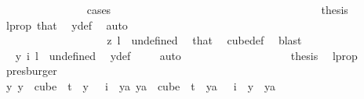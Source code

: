 \begin{isabellebody}
\ \ \ \ \ \ \ \ \ \ \ \ \ \ \isamarkupfalse%
\ cases\isanewline
\ \ \ \ \ \ \ \ \ \ \ \ \ \ \ \ \isamarkupfalse%
\ {}\isanewline
\ \ \ \ \ \ \ \ \ \ \ \ \ \ \ \ \isamarkupfalse%
\ \isamarkupfalse%
\ {\isacharquery}{\kern0pt}thesis\ \isamarkupfalse%
\ l{\isacharunderscore}{\kern0pt}prop\ that{\isacharparenleft}{\kern0pt}{}{\isacharparenright}{\kern0pt}\ \isamarkupfalse%
\ y{\isacharunderscore}{\kern0pt}def\ \isamarkupfalse%
\ auto\isanewline
\ \ \ \ \ \ \ \ \ \ \ \ \ \ \isamarkupfalse%
\isanewline
\ \ \ \ \ \ \ \ \ \ \ \ \ \ \ \ \isamarkupfalse%
\ {}\isanewline
\ \ \ \ \ \ \ \ \ \ \ \ \ \ \ \ \isamarkupfalse%
\ \isamarkupfalse%
\ {\isachardoublequoteopen}z\ l\ {\isacharequal}{\kern0pt}\ undefined{\isachardoublequoteclose}\ \isamarkupfalse%
\ that\ \isamarkupfalse%
\ cube{\isacharunderscore}{\kern0pt}def\ \isamarkupfalse%
\ blast\isanewline
\ \ \ \ \ \ \ \ \ \ \ \ \ \ \ \ \isamarkupfalse%
\ \isamarkupfalse%
\ {\isachardoublequoteopen}y\ i\ l\ {\isacharequal}{\kern0pt}\ undefined{\isachardoublequoteclose}\ \isamarkupfalse%
\ y{\isacharunderscore}{\kern0pt}def\ \isamarkupfalse%
\ {}\ \isamarkupfalse%
\ auto\isanewline
\ \ \ \ \ \ \ \ \ \ \ \ \ \ \ \ \isamarkupfalse%
\ \isamarkupfalse%
\ {\isacharquery}{\kern0pt}thesis\ \isamarkupfalse%
\ l{\isacharunderscore}{\kern0pt}prop\ \isamarkupfalse%
\ presburger\isanewline
\ \ \ \ \ \ \ \ \ \ \ \ \ \ \isamarkupfalse%
\isanewline
\ \ \ \ \ \ \ \ \ \ \ \ \isamarkupfalse%
\isanewline
\ \ \ \ \ \ \ \ \ \ \ \ \isamarkupfalse%
\ \isamarkupfalse%
\ {\isachardoublequoteopen}{\isasymexists}y{\isachardot}{\kern0pt}\ {\isacharparenleft}{\kern0pt}y\ {\isasymin}\ cube\ {}\ t\ {\isasymand}\ y\ {}\ {\isacharequal}{\kern0pt}\ i{\isacharparenright}{\kern0pt}\ {\isasymand}\ {\isacharparenleft}{\kern0pt}{\isasymforall}ya{\isachardot}{\kern0pt}\ ya\ {\isasymin}\ cube\ {}\ t\ {\isasymand}\ ya\ {}\ {\isacharequal}{\kern0pt}\ i\ {\isasymlongrightarrow}\ y\ {\isacharequal}{\kern0pt}\ ya{\isacharparenright}{\kern0pt}{\isachardoublequoteclose}\ \isamarkupfalse%

\end{isabellebody}
